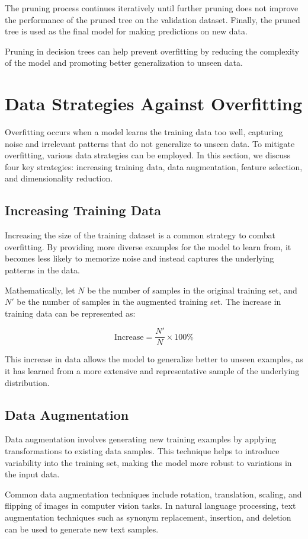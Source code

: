 \documentclass[12pt]{book} %
\begin{document}
The pruning process continues iteratively until further pruning does not improve the performance of the pruned tree on the validation dataset. Finally, the pruned tree is used as the final model for making predictions on new data.

Pruning in decision trees can help prevent overfitting by reducing the complexity of the model and promoting better generalization to unseen data.

\section{Data Strategies Against Overfitting}
Overfitting occurs when a model learns the training data too well, capturing noise and irrelevant patterns that do not generalize to unseen data. To mitigate overfitting, various data strategies can be employed. In this section, we discuss four key strategies: increasing training data, data augmentation, feature selection, and dimensionality reduction.

\subsection{Increasing Training Data}
Increasing the size of the training dataset is a common strategy to combat overfitting. By providing more diverse examples for the model to learn from, it becomes less likely to memorize noise and instead captures the underlying patterns in the data.

Mathematically, let \(N\) be the number of samples in the original training set, and \(N'\) be the number of samples in the augmented training set. The increase in training data can be represented as:

\[
\text{{Increase}} = \frac{{N'}}{{N}} \times 100\%
\]

This increase in data allows the model to generalize better to unseen examples, as it has learned from a more extensive and representative sample of the underlying distribution.

\subsection{Data Augmentation}
Data augmentation involves generating new training examples by applying transformations to existing data samples. This technique helps to introduce variability into the training set, making the model more robust to variations in the input data.

Common data augmentation techniques include rotation, translation, scaling, and flipping of images in computer vision tasks. In natural language processing, text augmentation techniques such as synonym replacement, insertion, and deletion can be used to generate new text samples.
\end{document}
